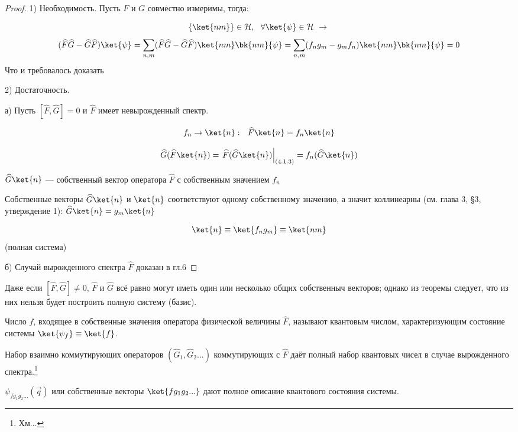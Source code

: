 \begin{proof}
1) Необходимость. Пусть $F$ и $G$ совместно измеримы, тогда:

$$ \{\ket{nm}\} \in \mathcal{H},~~ \forall \ket{\psi} \in \mathcal{H} ~\rightarrow ~$$
$$(\widehat{F}\widehat{G} - \widehat{G}\widehat{F}) \ket{\psi} = \sum_{n,m} (\widehat{F}\widehat{G} - \widehat{G}\widehat{F}) \ket{nm}\bk{nm}{\psi} = \sum_{n,m} (f_n g_m - g_m f_n) \ket{nm}\bk{nm}{\psi} = 0$$
Что и требовалось доказать

2) Достаточность. 

а) Пусть $[\widehat{F}, \widehat{G}] = 0$ и $\widehat{F}$ имеет невырожденный спектр.

\begin{equation}
\label{eq:4_1_3}
f_n \rightarrow \ket{n}:~~ \widehat{F} \ket{n} = f_n \ket{n}
\end{equation}

$$\widehat{G}(\widehat{F} \ket{n}) = \left. \widehat{F}(\widehat{G}\ket{n}) \right|_{(4.1.3)} = f_n (\widehat{G}\ket{n})$$

$\widehat{G} \ket{n}$ --- собственный вектор оператора $\widehat{F}$ с собственным значением $f_n$

Собственные векторы $\widehat{G} \ket{n}$ и $\ket{n}$ соответствуют одному собственному значению, а значит коллинеарны (см. глава 3, \S 3, утверждение 1): $\widehat{G} \ket{n} = g_m \ket{n}$

$$\ket{n} \equiv \ket{f_n g_m} \equiv \ket{nm}$$ (полная система)

б) Случай вырожденного спектра $\widehat{F}$ доказан в гл.6

\end{proof}

Даже если $[\widehat{F},\widehat{G}]\ne0$,  $\widehat{F}$ и $\widehat{G}$ всё равно могут иметь один или несколько общих собственныч векторов; однако из теоремы следует, что из них нельзя будет построить полную систему (базис).

\begin{defn}
Число $f$, входящее в собственные значения оператора физической величины $\widehat{F}$, называют квантовым числом, характеризующим состояние системы $\ket{\psi_f}\equiv\ket{f}$.
\end{defn}

Набор взаимно коммутирующих операторов $(\widehat{G}_1, \widehat{G}_2...)$ коммутирующих с $\widehat{F}$ даёт полный набор квантовых чисел в случае вырожденного спектра.\footnote{Хм...}

$\psi_{f g_1 g_2 ...}(\vec{q})$ или собственные векторы $\ket{f g_1 g_2 ...}$ дают полное описание квантового состояния системы.

